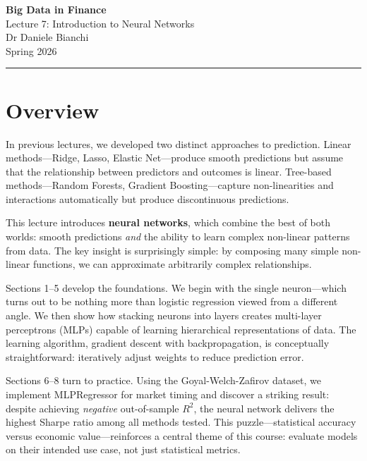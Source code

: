\documentclass[11pt,a4paper]{article}
\newcommand{\keyword}[1]{\textbf{\textcolor{AccentOrange}{#1}}}
\begin{document}
\begin{center}
    {\LARGE\bfseries\textcolor{ThemeBlue}{Big Data in Finance}}\\[0.5em]
    {\Large Lecture 7: Introduction to Neural Networks}\\[1em]
    {\large Dr Daniele Bianchi}\\[0.5em]
    {\normalsize Spring 2026}
\end{center}

\vspace{1em}
\hrule
\vspace{1em}

\tableofcontents

\vspace{2cm}

\section*{Overview}
In previous lectures, we developed two distinct approaches to prediction. Linear methods---Ridge, Lasso, Elastic Net---produce smooth predictions but assume that the relationship between predictors and outcomes is linear. Tree-based methods---Random Forests, Gradient Boosting---capture non-linearities and interactions automatically but produce discontinuous predictions.

This lecture introduces \keyword{neural networks}, which combine the best of both worlds: smooth predictions \textit{and} the ability to learn complex non-linear patterns from data. The key insight is surprisingly simple: by composing many simple non-linear functions, we can approximate arbitrarily complex relationships.

Sections 1--5 develop the foundations. We begin with the single neuron---which turns out to be nothing more than logistic regression viewed from a different angle. We then show how stacking neurons into layers creates multi-layer perceptrons (MLPs) capable of learning hierarchical representations of data. The learning algorithm, gradient descent with backpropagation, is conceptually straightforward: iteratively adjust weights to reduce prediction error.

Sections 6--8 turn to practice. Using the Goyal-Welch-Zafirov dataset, we implement MLPRegressor for market timing and discover a striking result: despite achieving \textit{negative} out-of-sample $R^2$, the neural network delivers the highest Sharpe ratio among all methods tested. This puzzle---statistical accuracy versus economic value---reinforces a central theme of this course: evaluate models on their intended use case, not just statistical metrics.
\end{document}
